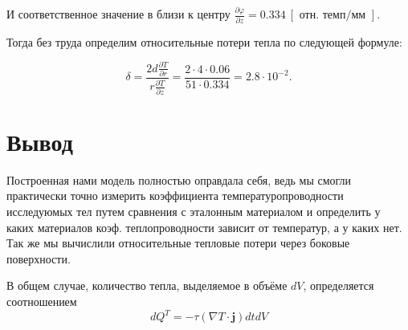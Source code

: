 \documentclass[a4paper,11.5pt]{article} %
\begin{document}
И соответственное значение в близи к центру $\frac{\partial \varphi }{\partial z} = 0.334 \ [\text{ отн. темп} / \text{мм }].$

Тогда без труда определим относительные потери тепла по следующей формуле:

\[ \delta = \frac{2d \frac{\partial T}{\partial r}}{r \frac{\partial T}{\partial z}}  = \frac{2 \cdot 4 \cdot 0.06}{51 \cdot 0.334} = 2.8 \cdot 10^{-2} .\]


\section{Вывод}
Построенная нами модель полностью оправдала себя, ведь мы смогли практически точно измерить коэффициента температуропроводности исследуюмых тел путем сравнения с эталонным материалом и определить у каких материалов коэф. теплопроводности зависит от температур, а у каких нет. Так же мы вычислили относительные тепловые потери через боковые поверхности.

В общем случае, количество тепла, выделяемое в объёме $d V$, определяется соотношением
$$
d Q^{T}=-\tau(\nabla T \cdot \mathbf{j}) d t d V
$$

\begin{figure}[h]
\end{figure}


					
\end{document}
